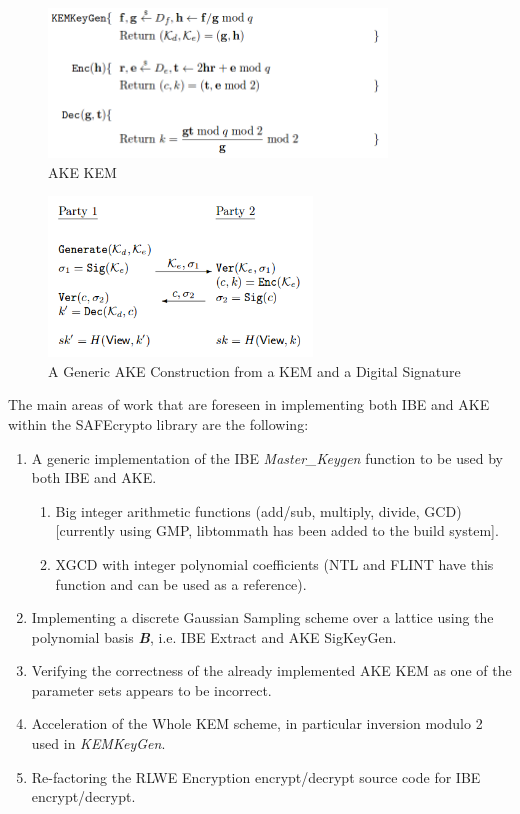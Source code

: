 \begin{figure}[H]
\centering
\includegraphics[width=9cm]{ake_kem.png}
\caption{AKE KEM}
\label{fig:ake_kem}
\end{figure}

\begin{figure}[H]
\centering
\includegraphics[width=7cm]{generic_ake.png}
\caption{A Generic AKE Construction from a KEM and a Digital Signature}
\label{fig:generic_ake}
\end{figure}

The main areas of work that are foreseen in implementing both IBE and AKE within the SAFEcrypto library are the following:

\begin{enumerate}[1]
\item A generic implementation of the IBE \textit{Master\_Keygen} function to be used by both IBE and AKE.
\begin{enumerate}[a]
\item Big integer arithmetic functions (add/sub, multiply, divide, GCD) [currently using GMP, libtommath has been added to the build system].
\item XGCD with integer polynomial coefficients (NTL and FLINT have this function and can be used as a reference).
\end{enumerate}
\item Implementing a discrete Gaussian Sampling scheme over a lattice using the polynomial basis \textit{\textbf{B}}, i.e. IBE Extract and AKE SigKeyGen.
\item Verifying the correctness of the already implemented AKE KEM as one of the parameter sets appears to be incorrect.
\item Acceleration of the Whole KEM scheme, in particular inversion modulo 2 used in \textit{KEMKeyGen}.
\item Re-factoring the RLWE Encryption encrypt/decrypt source code for IBE encrypt/decrypt.
\end{enumerate}
